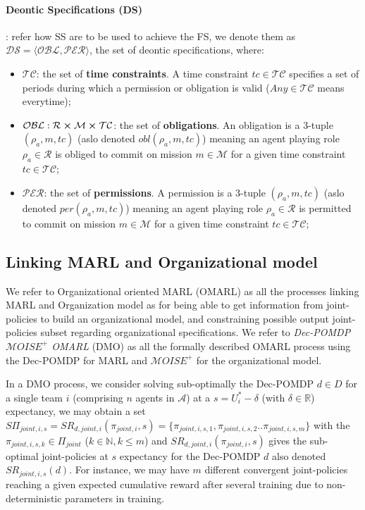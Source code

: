 \documentclass{ecai}
\begin{document}
\paragraph{\textbf{Deontic Specifications (DS)}}: refer how SS are to be used to achieve the FS, we denote them as $\mathcal{DS} = \langle \mathcal{OBL},\mathcal{PER} \rangle$, the set of deontic specifications, where:

\begin{itemize}
    \item $\mathcal{TC}$: the set of \textbf{time constraints}. A time constraint $tc \in \mathcal{TC}$ specifies a set of periods during which a permission or obligation is valid ($Any \in \mathcal{TC}$ means everytime);
    \item $\mathcal{OBL}: \mathcal{R} \cross \mathcal{M} \cross \mathcal{TC}$: the set of \textbf{obligations}. An obligation is a 3-tuple $(\rho_a,m,tc)$ (aslo denoted $obl(\rho_a,m,tc)$) meaning an agent playing role $\rho_a \in \mathcal{R}$ is obliged to commit on mission $m \in \mathcal{M}$ for a given time constraint $tc \in \mathcal{TC}$;
    \item $\mathcal{PER}$: the set of \textbf{permissions}. A permission is a 3-tuple $(\rho_a,m,tc)$ (aslo denoted $per(\rho_a,m,tc)$) meaning an agent playing role $\rho_a \in \mathcal{R}$ is permitted to commit on mission $m \in \mathcal{M}$ for a given time constraint $tc \in \mathcal{TC}$;
\end{itemize}

\subsection{Linking MARL and Organizational model}

We refer to Organizational oriented MARL (OMARL) as all the processes linking MARL and Organization model as for being able to get information from joint-policies to build an organizational model, and constraining possible output joint-policies subset regarding organizational specifications. We refer to \emph{Dec-POMDP $\mathcal{M}OISE^+$ OMARL} (DMO) as all the formally described OMARL process using the Dec-POMDP for MARL and $\mathcal{M}OISE^+$ for the organizational model.

In a DMO process, we consider solving sub-optimally the Dec-POMDP $d \in D$ for a single team $i$ (comprising $n$ agents in $\mathcal{A}$) at a $s = U_i^* - \delta$ (with $\delta \in \mathbb{R}$) expectancy, we may obtain a set $S\Pi_{joint,i,s} = SR_{d,joint,i}(\pi_{joint,i},s) = \{\pi_{joint,i,s,1}, \pi_{joint,i,s,2} .. \pi_{joint,i,s,m}\}$ with the $\pi_{joint,i,s,k} \in \Pi_{joint}$ ($k \in \mathbb{N}, k \leq m$) and $SR_{d,joint,i}(\pi_{joint,i},s)$ gives the sub-optimal joint-policies at $s$ expectancy for the Dec-POMDP $d$ also denoted $SR_{joint,i,s}(d)$. For instance, we may have $m$ different convergent joint-policies reaching a given expected cumulative reward after several training due to non-deterministic parameters in training.
\end{document}
